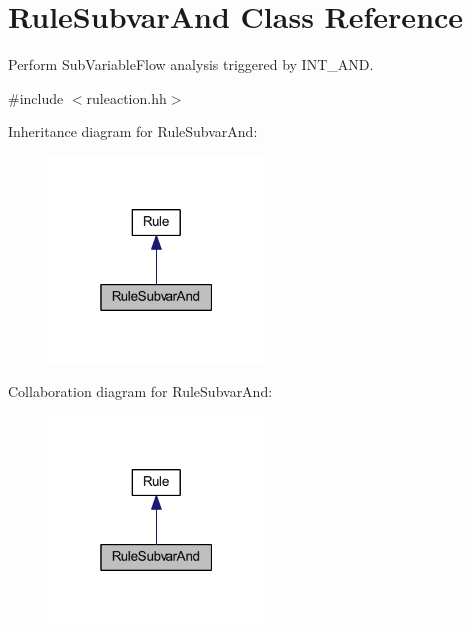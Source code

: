 \hypertarget{class_rule_subvar_and}{}\section{Rule\+Subvar\+And Class Reference}
\label{class_rule_subvar_and}


Perform Sub\+Variable\+Flow analysis triggered by I\+N\+T\+\_\+\+A\+ND.  




{\ttfamily \#include $<$ruleaction.\+hh$>$}



Inheritance diagram for Rule\+Subvar\+And\+:
\nopagebreak
\begin{figure}[H]
\begin{center}
\leavevmode
\includegraphics[width=163pt]{class_rule_subvar_and__inherit__graph}
\end{center}
\end{figure}


Collaboration diagram for Rule\+Subvar\+And\+:
\nopagebreak
\begin{figure}[H]
\begin{center}
\leavevmode
\includegraphics[width=163pt]{class_rule_subvar_and__coll__graph}
\end{center}
\end{figure}
